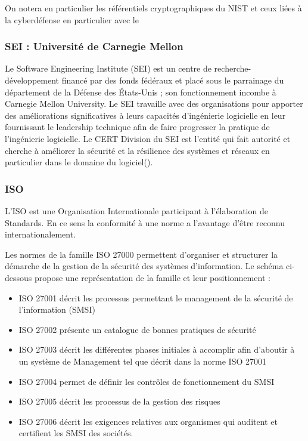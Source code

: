 On notera en particulier les référentiels cryptographiques du NIST et ceux liées à la cyberdéfense en particulier avec le 

\subsubsection{SEI : Université de Carnegie Mellon}


Le Software Engineering Institute (SEI) est un centre de recherche-développement financé par des fonds fédéraux et placé sous le parrainage du département de la Défense des États-Unis ; son fonctionnement incombe à Carnegie Mellon University. Le SEI travaille avec des organisations pour apporter des améliorations significatives à leurs capacités d’ingénierie logicielle en leur fournissant le leadership technique afin de faire progresser la pratique de l’ingénierie logicielle. Le CERT Division du SEI est l’entité qui fait autorité et cherche à améliorer la sécurité et la résilience des systèmes et réseaux en particulier dans le domaine du logiciel().

\subsubsection{ISO}


L’ISO est une Organisation Internationale participant à l’élaboration de Standards. En ce sens la conformité à une norme a l’avantage d’être reconnu internationalement.
 
Les normes de la famille ISO 27000 permettent d’organiser et structurer la démarche de la gestion de la sécurité des systèmes d’information. Le schéma ci-dessous propose une représentation de la famille et leur positionnement : 

\begin{itemize}
  \item ISO 27001 décrit les processus permettant le management de la sécurité de l’information (SMSI)
  \item ISO 27002 présente un catalogue de bonnes pratiques de sécurité
  \item ISO 27003 décrit les différentes phases initiales à accomplir afin d’aboutir à un système de Management tel que décrit dans la norme ISO 27001
  \item ISO 27004 permet de définir les contrôles de fonctionnement du SMSI
  \item ISO 27005 décrit les processus de la gestion des risques
  \item ISO 27006 décrit les exigences relatives aux organismes qui auditent et certifient les SMSI des sociétés.
\end{itemize}

